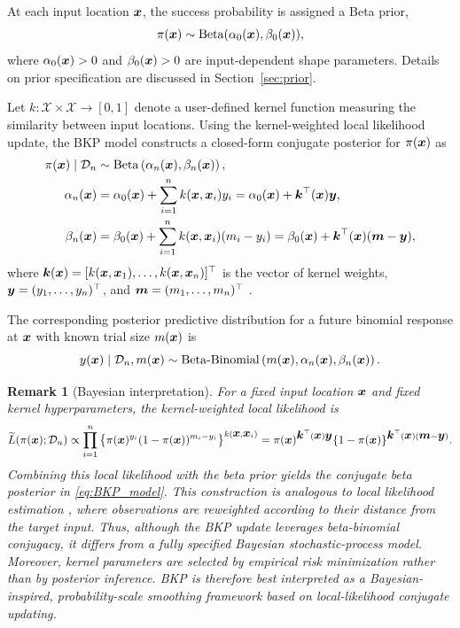 \documentclass[article, shortnames]{jss}
\newtheorem{remark}{Remark}
\renewcommand{\vec}[1]{\mbox{\boldmath ${#1}$}}
\begin{document}
At each input location $\vec{x}$, the success probability is assigned a Beta prior,
\[
	\pi(\vec{x}) \sim \mathrm{Beta}(\alpha_0(\vec{x}), \beta_0(\vec{x})),
\]
where $\alpha_0(\vec{x}) > 0$ and $\beta_0(\vec{x}) > 0$ are input-dependent shape parameters. Details on prior specification are discussed in Section~\ref{sec:prior}.

Let $k: \mathcal{X} \times \mathcal{X} \to [0,1]$ denote a user-defined kernel function measuring the similarity between input locations. 
Using the kernel-weighted local likelihood update, the BKP model constructs a closed-form conjugate posterior for $\pi(\vec{x})$ as
\begin{align}\label{eq:BKP_model}
	\pi(\vec{x}) \mid \mathcal{D}_n &\sim \mathrm{Beta}\left(\alpha_n(\vec{x}), \beta_n(\vec{x})\right), \notag \\
	\alpha_n(\vec{x}) &= \alpha_0(\vec{x}) + \sum_{i=1}^{n} k(\vec{x}, \vec{x}_i) y_i = \alpha_0(\vec{x}) + \vec{k}^\top(\vec{x}) \vec{y}, \\
	\beta_n(\vec{x})  &= \beta_0(\vec{x}) + \sum_{i=1}^{n} k(\vec{x}, \vec{x}_i) (m_i - y_i) = \beta_0(\vec{x}) + \vec{k}^\top(\vec{x}) (\vec{m} - \vec{y}), \notag
\end{align}
where $\vec{k}(\vec{x}) = [k(\vec{x}, \vec{x}_1), \ldots, k(\vec{x}, \vec{x}_n)]^\top$ is the vector of kernel weights, $\vec{y}=(y_1,\ldots,y_n)^\top$,  and $\vec{m}=(m_1,\ldots,m_n)^\top$ \citep{Goetschalckx:2011, Rolland2019BKP}.

The corresponding posterior predictive distribution for a future binomial response at $\vec{x}$ with known trial size $m(\vec{x})$ is
\begin{equation}\label{eq:BKP_predictive_count}
	y(\vec{x}) \mid \mathcal{D}_n, m(\vec{x})
	\sim \mathrm{Beta\mbox{-}Binomial}
	\left(m(\vec{x}), \alpha_n(\vec{x}), \beta_n(\vec{x})\right).
\end{equation}

\begin{remark}[Bayesian interpretation]
For a fixed input location $\vec{x}$ and fixed kernel hyperparameters, the kernel-weighted local likelihood is
\[
	\widetilde{L}(\pi(\vec{x}); \mathcal{D}_n) 
	\propto \prod_{i=1}^{n} \left\{\pi(\vec{x})^{y_i}(1-\pi(\vec{x}))^{m_i - y_i} \right\}^{k(\vec{x}, \vec{x}_i)}
	= \pi(\vec{x})^{\vec{k}^\top(\vec{x}) \vec{y}} \{1 - \pi(\vec{x})\}^{\vec{k}^\top(\vec{x}) (\vec{m}-\vec{y})}.
\]
Combining this local likelihood with the beta prior yields the conjugate beta posterior in \eqref{eq:BKP_model}. 
This construction is analogous to local likelihood estimation \citep{Fan1998LocalMLE}, where observations are reweighted according to their distance from the target input. 
Thus, although the BKP update leverages beta-binomial conjugacy, it differs from a fully specified Bayesian stochastic-process model. 
Moreover, kernel parameters are selected by empirical risk minimization rather than by posterior inference. 
BKP is therefore best interpreted as a Bayesian-inspired, probability-scale smoothing framework based on local-likelihood conjugate updating.
\end{remark}
\end{document}
